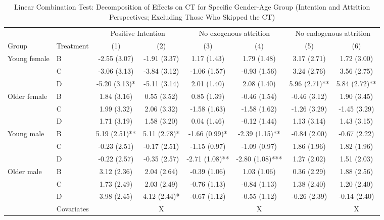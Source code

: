 \documentclass[12pt, a4paper]{article}
\begin{document}
\begin{table}[H]

\caption{\label{tab:lh-interaction-gender-age-test-decompose-noskip}Linear Combination Test: Decomposition of Effects on CT for Specific Gender-Age Group (Intention and Attrition Perspectives; Excluding Those Who Skipped the CT)}
\centering
\fontsize{8}{10}\selectfont
\begin{threeparttable}
\begin{tabular}[t]{llcccccc}
\toprule
\multicolumn{2}{c}{ } & \multicolumn{2}{c}{Positive Intention} & \multicolumn{2}{c}{No exogenous attrition} & \multicolumn{2}{c}{No endogenous attrition} \\
\cmidrule(l{3pt}r{3pt}){3-4} \cmidrule(l{3pt}r{3pt}){5-6} \cmidrule(l{3pt}r{3pt}){7-8}
Group & Treatment & (1) & (2) & (3) & (4) & (5) & (6)\\
\midrule
Young female & B & -2.55 (3.07) & -1.91 (3.37) & 1.17 (1.43) & 1.79 (1.48) & 3.17 (2.71) & 1.72 (3.00)\\
 & C & -3.06 (3.13) & -3.84 (3.12) & -1.06 (1.57) & -0.93 (1.56) & 3.24 (2.76) & 3.56 (2.75)\\
 & D & -5.20 (3.13)* & -5.11 (3.14) & 2.01 (1.40) & 2.08 (1.40) & 5.96 (2.71)** & 5.84 (2.72)**\\
Older female & B & 1.84 (3.16) & 0.55 (3.52) & 0.85 (1.39) & -0.46 (1.54) & -0.46 (3.12) & 1.90 (3.45)\\
 & C & 1.99 (3.32) & 2.06 (3.32) & -1.58 (1.63) & -1.58 (1.62) & -1.26 (3.29) & -1.45 (3.29)\\
 & D & 1.71 (3.19) & 1.58 (3.20) & 0.04 (1.46) & -0.12 (1.44) & 1.13 (3.14) & 1.43 (3.15)\\
Young male & B & 5.19 (2.51)** & 5.11 (2.78)* & -1.66 (0.99)* & -2.39 (1.15)** & -0.84 (2.00) & -0.67 (2.22)\\
 & C & -0.23 (2.51) & -0.17 (2.51) & -1.15 (0.97) & -1.09 (0.97) & 1.86 (1.96) & 1.82 (1.96)\\
 & D & -0.22 (2.57) & -0.35 (2.57) & -2.71 (1.08)** & -2.80 (1.08)*** & 1.27 (2.02) & 1.51 (2.03)\\
Older male & B & 3.12 (2.36) & 2.04 (2.64) & -0.39 (1.06) & 1.03 (1.06) & 0.36 (2.29) & 1.88 (2.56)\\
 & C & 1.73 (2.49) & 2.03 (2.49) & -0.76 (1.13) & -0.84 (1.13) & 1.38 (2.40) & 1.20 (2.40)\\
 & D & 3.98 (2.45) & 4.12 (2.44)* & -0.67 (1.12) & -0.55 (1.12) & -0.26 (2.39) & -0.14 (2.40)\\
\midrule
 & Covariates &  & X &  & X &  & X\\

\end{tabular}
\end{threeparttable}
\end{table}
\end{document}
